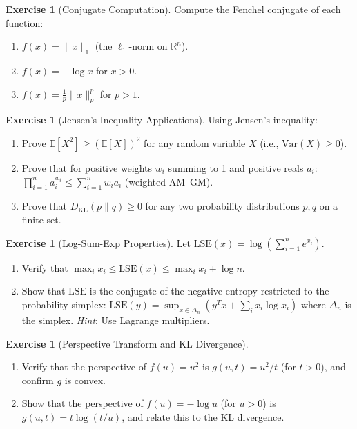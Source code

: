 \documentclass[11pt,a4paper]{article}
\theoremstyle{definition}
\newtheorem{exercise}[theorem]{Exercise}
\theoremstyle{remark}
\newcommand{\R}{\mathbb{R}}
\newcommand{\E}{\mathbb{E}}
\begin{document}
\begin{exercise}[Conjugate Computation]
\label{ex:conjugate-compute}
Compute the Fenchel conjugate of each function:
\begin{enumerate}[label=(\alph*)]
  \item $f(x) = \|x\|_1$ (the $\ell_1$-norm on $\R^n$).
  \item $f(x) = -\log x$ for $x > 0$.
  \item $f(x) = \frac{1}{p}\|x\|_p^p$ for $p > 1$.
\end{enumerate}
\end{exercise}

\begin{exercise}[Jensen's Inequality Applications]
\label{ex:jensen-apps}
Using Jensen's inequality:
\begin{enumerate}[label=(\alph*)]
  \item Prove $\E[X^2] \ge (\E[X])^2$ for any random variable $X$ (i.e., $\text{Var}(X) \ge 0$).
  \item Prove that for positive weights $w_i$ summing to 1 and positive reals $a_i$:
        $\prod_{i=1}^n a_i^{w_i} \le \sum_{i=1}^n w_i a_i$ (weighted AM--GM).
  \item Prove that $D_{\text{KL}}(p \| q) \ge 0$ for any two probability distributions
        $p, q$ on a finite set.
\end{enumerate}
\end{exercise}

\begin{exercise}[Log-Sum-Exp Properties]
\label{ex:lse-properties}
Let $\text{LSE}(x) = \log(\sum_{i=1}^n e^{x_i})$.
\begin{enumerate}[label=(\alph*)]
  \item Verify that $\max_i x_i \le \text{LSE}(x) \le \max_i x_i + \log n$.
  \item Show that $\text{LSE}$ is the conjugate of the negative entropy restricted to the
        probability simplex: $\text{LSE}(y) = \sup_{x \in \Delta_n}
        (y^T x + \sum_i x_i \log x_i)$ where $\Delta_n$ is the simplex.
        \textit{Hint}: Use Lagrange multipliers.
\end{enumerate}
\end{exercise}

\begin{exercise}[Perspective Transform and KL Divergence]
\label{ex:perspective-kl}
\begin{enumerate}[label=(\alph*)]
  \item Verify that the perspective of $f(u) = u^2$ is $g(u, t) = u^2 / t$ (for $t > 0$),
        and confirm $g$ is convex.
  \item Show that the perspective of $f(u) = -\log u$ (for $u > 0$) is
        $g(u, t) = t \log(t/u)$, and relate this to the KL divergence.
\end{enumerate}
\end{exercise}
\end{document}
